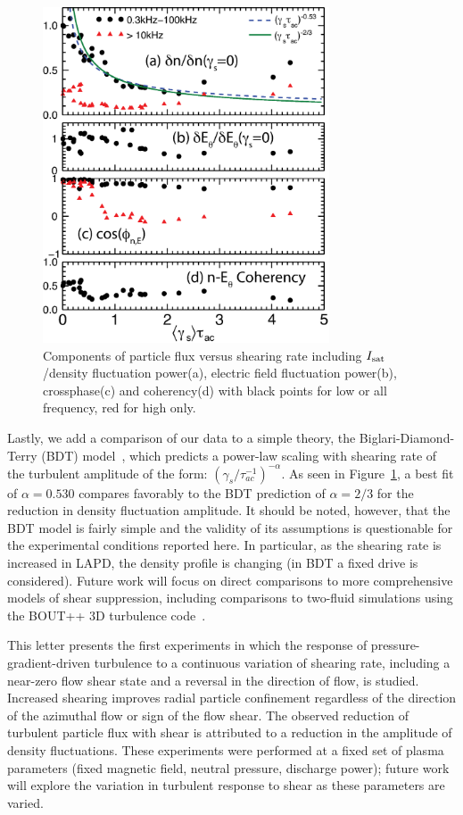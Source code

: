 \documentclass[aps,prl,amsmath,amssymb,preprint,superscriptaddress]{revtex4} %
\begin{document}
\begin{figure}[!htbp]
\centerline{
\includegraphics[width=8.5cm]{figure5.eps}}
\caption{\label{fig:fluxcomps} Components of particle flux versus shearing rate including $I_{\rm sat}$/density fluctuation power(a), electric field fluctuation power(b), crossphase(c) and coherency(d) with black points for low or all frequency, red for high only.}
\end{figure}

Lastly, we add a comparison of our data to a simple theory, the
Biglari-Diamond-Terry (BDT) model~\cite{biglari90}, which predicts a
power-law scaling with shearing rate of the turbulent
amplitude of the form: $\left(\gamma_{s}/\tau_{ac}^{-1}\right)^{-\alpha}$. As seen in
Figure~\ref{fig:fluxcomps}, a best fit of $\alpha = 0.530$ compares
favorably to the BDT prediction of $\alpha = 2/3$ for the reduction in
density fluctuation amplitude. 
It should be noted, however, that the
BDT model is fairly simple and the validity of its assumptions is
questionable for the experimental conditions reported here.  In
particular, as the shearing rate is increased in LAPD, the density
profile is changing (in BDT a fixed drive is considered).  Future work
will focus on direct comparisons to more comprehensive models of shear
suppression, including comparisons to two-fluid simulations using the
BOUT++ 3D turbulence code~\cite{umansky11}.  

This letter presents the first experiments in which the response of
pressure-gradient-driven turbulence to a continuous
variation of shearing rate, including a near-zero flow shear state and
a reversal in the direction of flow, is studied.  Increased shearing
improves radial particle confinement regardless of the direction of
the azimuthal flow or sign of the flow shear. The observed reduction of
turbulent particle flux with shear is attributed to a reduction in the
amplitude of density fluctuations. These
experiments were performed at a fixed set of plasma parameters (fixed
magnetic field, neutral pressure, discharge power); future work will
explore the variation in turbulent response to shear as these
parameters are varied.  
\end{document}
